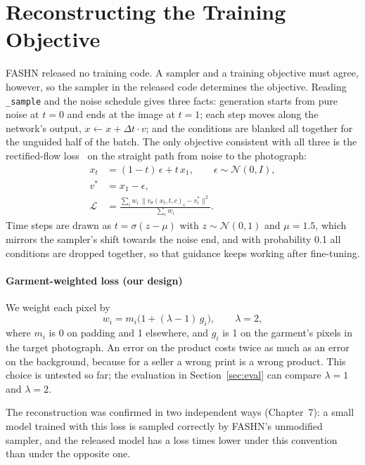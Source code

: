 \section{Reconstructing the Training Objective}

FASHN released no training code. A sampler and a training objective must agree, however, so the sampler in the released code determines the objective. Reading \texttt{\_sample} and the noise schedule gives three facts: generation starts from pure noise at $t = 0$ and ends at the image at $t = 1$; each step moves along the network's output, $x \leftarrow x + \Delta t \cdot v$; and the conditions are blanked all together for the unguided half of the batch. The only objective consistent with all three is the rectified-flow loss~\cite{rectflow,flowmatch} on the straight path from noise to the photograph:
\begin{align}
x_t &= (1 - t)\,\epsilon + t\,x_1, \qquad \epsilon \sim \mathcal{N}(0, I), \\
v^{*} &= x_1 - \epsilon, \\
\mathcal{L} &= \frac{\sum_i w_i \,\lVert v_\theta(x_t, t, c)_i - v^{*}_i \rVert^2}{\sum_i w_i}.
\end{align}
Time steps are drawn as $t = \sigma(z - \mu)$ with $z \sim \mathcal{N}(0, 1)$ and $\mu = 1.5$, which mirrors the sampler's shift towards the noise end, and with probability 0.1 all conditions are dropped together, so that guidance keeps working after fine-tuning.

\paragraph{Garment-weighted loss (our design)} We weight each pixel by
\begin{equation}
w_i = m_i \big(1 + (\lambda - 1)\, g_i\big), \qquad \lambda = 2,
\end{equation}
where $m_i$ is 0 on padding and 1 elsewhere, and $g_i$ is 1 on the garment's pixels in the target photograph. An error on the product costs twice as much as an error on the background, because for a seller a wrong print is a wrong product. This choice is untested so far; the evaluation in Section~\ref{sec:eval} can compare $\lambda = 1$ and $\lambda = 2$.

The reconstruction was confirmed in two independent ways (Chapter~7): a small model trained with this loss is sampled correctly by FASHN's unmodified sampler, and the released model has a loss \vLossRatio{} times lower under this convention than under the opposite one.

